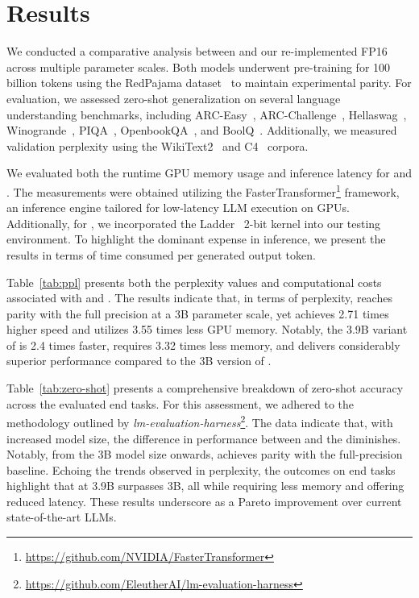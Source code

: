 \section{Results}

We conducted a comparative analysis between  and our re-implemented FP16  across multiple parameter scales. Both models underwent pre-training for 100 billion tokens using the RedPajama dataset~\cite{redpajama} to maintain experimental parity. For evaluation, we assessed zero-shot generalization on several language understanding benchmarks, including ARC-Easy~\cite{arc}, ARC-Challenge~\cite{arc}, Hellaswag~\cite{hellaswag}, Winogrande~\cite{winoGrande}, PIQA~\cite{piqa}, OpenbookQA~\cite{openbookqa}, and BoolQ~\cite{boolq}. Additionally, we measured validation perplexity using the WikiText2~\cite{wikitext2} and C4~\cite{c4} corpora.

We evaluated both the runtime GPU memory usage and inference latency for  and . The measurements were obtained utilizing the FasterTransformer\footnote{\url{https://github.com/NVIDIA/FasterTransformer}} framework, an inference engine tailored for low-latency LLM execution on GPUs. Additionally, for , we incorporated the Ladder~\cite{ladder} 2-bit kernel into our testing environment. To highlight the dominant expense in inference, we present the results in terms of time consumed per generated output token.

Table~\ref{tab:ppl} presents both the perplexity values and computational costs associated with  and . The results indicate that, in terms of perplexity,  reaches parity with the full precision  at a 3B parameter scale, yet achieves 2.71 times higher speed and utilizes 3.55 times less GPU memory. Notably, the 3.9B variant of  is 2.4 times faster, requires 3.32 times less memory, and delivers considerably superior performance compared to the 3B version of .

Table~\ref{tab:zero-shot} presents a comprehensive breakdown of zero-shot accuracy across the evaluated end tasks. For this assessment, we adhered to the methodology outlined by \emph{lm-evaluation-harness}\footnote{\url{https://github.com/EleutherAI/lm-evaluation-harness}}. The data indicate that, with increased model size, the difference in performance between  and the  diminishes. Notably, from the 3B model size onwards,  achieves parity with the full-precision baseline. Echoing the trends observed in perplexity, the outcomes on end tasks highlight that  at 3.9B surpasses  3B, all while requiring less memory and offering reduced latency. These results underscore  as a Pareto improvement over current state-of-the-art LLMs.

